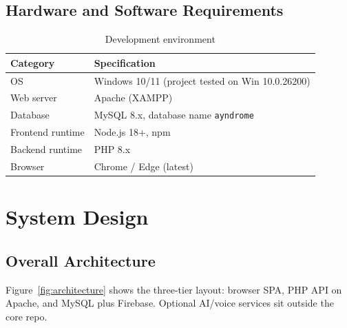 \documentclass[12pt,a4paper,oneside]{report}
\begin{document}
\section{Hardware and Software Requirements}
\begin{table}[H]
    \centering
    \caption{Development environment}
    \label{tab:env}
    \begin{tabular}{@{}ll@{}}
        \toprule
        \textbf{Category} & \textbf{Specification} \\
        \midrule
        OS & Windows 10/11 (project tested on Win 10.0.26200) \\
        Web server & Apache (XAMPP) \\
        Database & MySQL 8.x, database name \texttt{ayndrome} \\
        Frontend runtime & Node.js 18+, npm \\
        Backend runtime & PHP 8.x \\
        Browser & Chrome / Edge (latest) \\
        \bottomrule
    \end{tabular}
\end{table}

\chapter{System Design}

\section{Overall Architecture}
Figure~\ref{fig:architecture} shows the three-tier layout: browser SPA, PHP API on Apache, and
MySQL plus Firebase. Optional AI/voice services sit outside the core repo.
\end{document}
